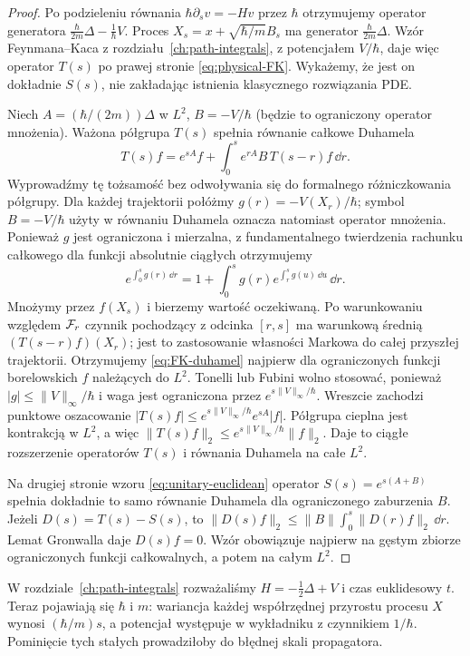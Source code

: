 \begin{proof}
Po podzieleniu równania $\hbar\partial_s v=-Hv$ przez
$\hbar$ otrzymujemy operator generatora
$\frac{\hbar}{2m}\Delta-\frac1\hbar V$.
Proces $X_s=x+\sqrt{\hbar/m}B_s$ ma generator
$\frac{\hbar}{2m}\Delta$.
Wzór Feynmana--Kaca z rozdziału~\ref{ch:path-integrals},
z potencjałem $V/\hbar$, daje więc operator $T(s)$ po
prawej stronie \eqref{eq:physical-FK}. Wykażemy, że jest
on dokładnie $S(s)$, nie zakładając istnienia klasycznego
rozwiązania PDE.

Niech $A=(\hbar/(2m))\Delta$ w $L^2$, $B=-V/\hbar$
(będzie to ograniczony operator mnożenia). Ważona
półgrupa $T(s)$ spełnia równanie całkowe Duhamela
\[
 T(s)f=e^{sA}f+\int_0^s e^{rA}B\,T(s-r)f\,\dd r.
\tag{16.4}\label{eq:FK-duhamel}
\]
Wyprowadźmy tę tożsamość bez odwoływania się do
formalnego różniczkowania półgrupy. Dla każdej trajektorii
połóżmy $g(r)=-V(X_r)/\hbar$; symbol $B=-V/\hbar$
użyty w równaniu Duhamela oznacza natomiast operator mnożenia.
Ponieważ $g$ jest ograniczona i mierzalna, z fundamentalnego
twierdzenia rachunku całkowego dla funkcji absolutnie
ciągłych otrzymujemy
\[
 e^{\int_0^s g(r)\,\dd r}
 =1+\int_0^s g(r)e^{\int_r^s g(u)\,\dd u}\,\dd r.
\]
Mnożymy przez $f(X_s)$ i bierzemy wartość oczekiwaną.
Po warunkowaniu względem $\mathcal{F}_r$ czynnik pochodzący
z odcinka $[r,s]$ ma warunkową średnią
$(T(s-r)f)(X_r)$; jest to zastosowanie własności Markowa
do całej przyszłej trajektorii. Otrzymujemy
\eqref{eq:FK-duhamel} najpierw dla ograniczonych
funkcji borelowskich $f$ należących do $L^2$.
Tonelli lub Fubini wolno stosować, ponieważ
$|g|\le\|V\|_\infty/\hbar$ i waga jest ograniczona przez
$e^{s\|V\|_\infty/\hbar}$.
Wreszcie zachodzi punktowe oszacowanie
$|T(s)f|\le e^{s\|V\|_\infty/\hbar}e^{sA}|f|$.
Półgrupa cieplna jest kontrakcją w $L^2$, a więc
$\|T(s)f\|_2\le e^{s\|V\|_\infty/\hbar}\|f\|_2$.
Daje to ciągłe rozszerzenie operatorów $T(s)$ i
równania Duhamela na całe $L^2$.

Na drugiej stronie wzoru \eqref{eq:unitary-euclidean}
operator $S(s)=e^{s(A+B)}$ spełnia dokładnie to samo
równanie Duhamela dla ograniczonego zaburzenia $B$.
Jeżeli $D(s)=T(s)-S(s)$, to
$\|D(s)f\|_2\le\|B\|\int_0^s\|D(r)f\|_2\,\dd r$.
Lemat Gronwalla daje $D(s)f=0$. Wzór obowiązuje
najpierw na gęstym zbiorze ograniczonych funkcji
całkowalnych, a potem na całym $L^2$.
\end{proof}

\begin{uwaga}
W rozdziale~\ref{ch:path-integrals} rozważaliśmy
$H=-\frac12\Delta+V$ i czas euklidesowy $t$.
Teraz pojawiają się $\hbar$ i $m$: wariancja każdej
współrzędnej przyrostu procesu $X$ wynosi
$(\hbar/m)s$, a potencjał występuje w wykładniku
z czynnikiem $1/\hbar$. Pominięcie tych stałych
prowadziłoby do błędnej skali propagatora.
\end{uwaga}

